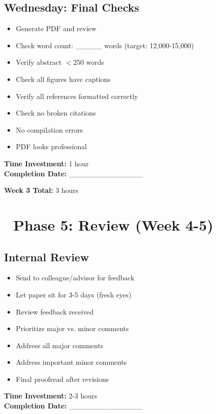 \documentclass[11pt]{article}
\begin{document}
\subsection*{Wednesday: Final Checks}
\begin{itemize}[label=$\square$]
    \item Generate PDF and review
    \item Check word count: \_\_\_\_\_ words (target: 12,000-15,000)
    \item Verify abstract $<$250 words
    \item Check all figures have captions
    \item Verify all references formatted correctly
    \item Check no broken citations
    \item No compilation errors
    \item PDF looks professional
\end{itemize}

\textbf{Time Investment:} 1 hour\\
\textbf{Completion Date:} \_\_\_\_\_\_\_\_\_\_\_\_\_\_

\textbf{Week 3 Total:} 3 hours

\section*{👥 Phase 5: Review (Week 4-5)}

\subsection*{Internal Review}
\begin{itemize}[label=$\square$]
    \item Send to colleague/advisor for feedback
    \item Let paper sit for 3-5 days (fresh eyes)
    \item Review feedback received
    \item Prioritize major vs. minor comments
    \item Address all major comments
    \item Address important minor comments
    \item Final proofread after revisions
\end{itemize}

\textbf{Time Investment:} 2-3 hours\\
\textbf{Completion Date:} \_\_\_\_\_\_\_\_\_\_\_\_\_\_
\end{document}
